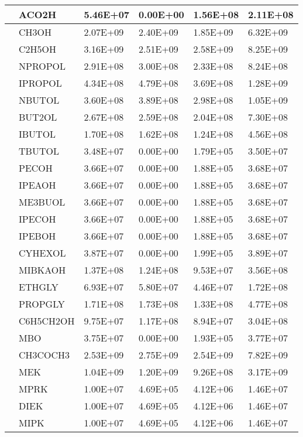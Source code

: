 \begin{longtable}{llllll}
	 & ACO2H & 5.46E+07 & 0.00E+00 & 1.56E+08 & 2.11E+08 \\
	\hline \parbox[t]{2mm}{} & CH3OH & 2.07E+09 & 2.40E+09 & 1.85E+09 & 6.32E+09 \\*
	 & C2H5OH & 3.16E+09 & 2.51E+09 & 2.58E+09 & 8.25E+09 \\*
	 & NPROPOL & 2.91E+08 & 3.00E+08 & 2.33E+08 & 8.24E+08 \\*
	 & IPROPOL & 4.34E+08 & 4.79E+08 & 3.69E+08 & 1.28E+09 \\*
	 & NBUTOL & 3.60E+08 & 3.89E+08 & 2.98E+08 & 1.05E+09 \\
	 & BUT2OL & 2.67E+08 & 2.59E+08 & 2.04E+08 & 7.30E+08 \\
	 & IBUTOL & 1.70E+08 & 1.62E+08 & 1.24E+08 & 4.56E+08 \\
	 & TBUTOL & 3.48E+07 & 0.00E+00 & 1.79E+05 & 3.50E+07 \\
	 & PECOH & 3.66E+07 & 0.00E+00 & 1.88E+05 & 3.68E+07 \\
	 & IPEAOH & 3.66E+07 & 0.00E+00 & 1.88E+05 & 3.68E+07 \\
	 & ME3BUOL & 3.66E+07 & 0.00E+00 & 1.88E+05 & 3.68E+07 \\
	 & IPECOH & 3.66E+07 & 0.00E+00 & 1.88E+05 & 3.68E+07 \\
	 & IPEBOH & 3.66E+07 & 0.00E+00 & 1.88E+05 & 3.68E+07 \\
	 & CYHEXOL & 3.87E+07 & 0.00E+00 & 1.99E+05 & 3.89E+07 \\
	 & MIBKAOH & 1.37E+08 & 1.24E+08 & 9.53E+07 & 3.56E+08 \\
	 & ETHGLY & 6.93E+07 & 5.80E+07 & 4.46E+07 & 1.72E+08 \\
	 & PROPGLY & 1.71E+08 & 1.73E+08 & 1.33E+08 & 4.77E+08 \\
	 & C6H5CH2OH & 9.75E+07 & 1.17E+08 & 8.94E+07 & 3.04E+08 \\
	 & MBO & 3.75E+07 & 0.00E+00 & 1.93E+05 & 3.77E+07 \\
	\hline \parbox[t]{2mm}{} & CH3COCH3 & 2.53E+09 & 2.75E+09 & 2.54E+09 & 7.82E+09 \\
	 & MEK & 1.04E+09 & 1.20E+09 & 9.26E+08 & 3.17E+09 \\
	 & MPRK & 1.00E+07 & 4.69E+05 & 4.12E+06 & 1.46E+07 \\
	 & DIEK & 1.00E+07 & 4.69E+05 & 4.12E+06 & 1.46E+07 \\
	 & MIPK & 1.00E+07 & 4.69E+05 & 4.12E+06 & 1.46E+07 \\

\end{longtable}
